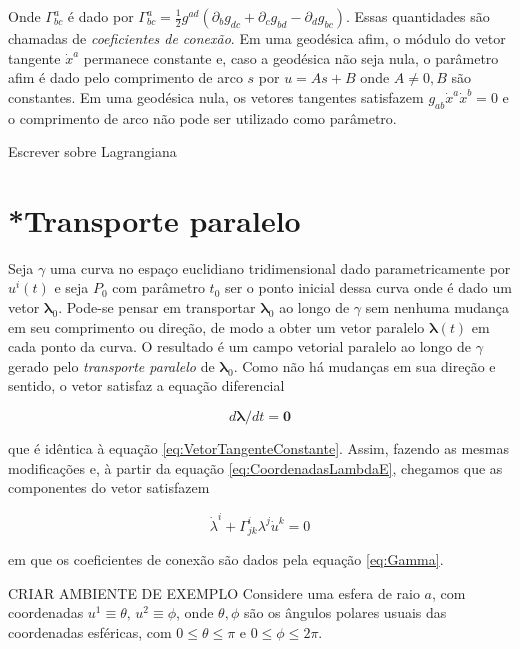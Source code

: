 Onde $ \Gamma^{a}_{bc} $ é dado por $ \Gamma_{b c}^{a}=\tfrac{1}{2} g^{a d}\left(\partial_{b} g_{d c}+\partial_{c} g_{b d}-\partial_{d} g_{b c}\right) $. Essas quantidades são chamadas de \textit{coeficientes de conexão}.
Em uma geodésica afim, o módulo do vetor tangente $ \dot{x}^a $ permanece constante e, caso a geodésica não seja nula, o parâmetro afim é dado pelo comprimento de arco $ s $ por $ u=As+B $ onde $ A\neq0,B $ são constantes. Em uma geodésica nula, os vetores tangentes satisfazem $ g_{a b} \dot{x}^{a} \dot{x}^{b}=0 $ e o comprimento de arco não pode ser utilizado como parâmetro.


{\color{red}Escrever sobre Lagrangiana}


 
\section{*Transporte paralelo}\label{sec:TransporteParalelo} %

Seja $ \gamma $ uma curva no espaço euclidiano tridimensional dado parametricamente por $ u^i(t) $ e seja $ P_0 $ com parâmetro $ t_0 $ ser o ponto inicial dessa curva onde é dado um vetor $ \boldsymbol{\lambda}_0 $. Pode-se pensar em transportar $ \boldsymbol{\lambda}_0 $ ao longo de $ \gamma $ sem nenhuma mudança em seu comprimento ou direção, de modo a obter um vetor paralelo $ \boldsymbol{\lambda}(t) $ em cada ponto da curva. O resultado é um campo vetorial paralelo ao longo de $ \gamma $ gerado pelo \textit{transporte paralelo} de $ \boldsymbol{\lambda}_0 $. Como não há mudanças em sua direção e sentido, o vetor satisfaz a equação diferencial 

\begin{equation}\label{eq:TransporteParalelo}
d \boldsymbol{\lambda} / d t=\mathbf{0}
\end{equation}

que é idêntica à equação \eqref{eq:VetorTangenteConstante}. Assim, fazendo as mesmas modificações e, à partir da equação \eqref{eq:CoordenadasLambdaE}, chegamos que as componentes do vetor satisfazem 

\begin{equation}\label{eq:CoordenadasLambda}
\dot{\lambda}^{i}+\Gamma_{j k}^{i} \lambda^{j} \dot{u}^{k}=0
\end{equation} 

em que os coeficientes de conexão são dados pela equação \eqref{eq:Gamma}.

{\color{red}CRIAR AMBIENTE DE EXEMPLO}
Considere uma esfera de raio $a$, com coordenadas $u^1\equiv \theta,\, u^2\equiv\phi$, onde $\theta,\phi$ são os ângulos polares usuais das coordenadas esféricas, com $0\leq\theta\leq\pi$ e $0\leq\phi\leq 2\pi$.

